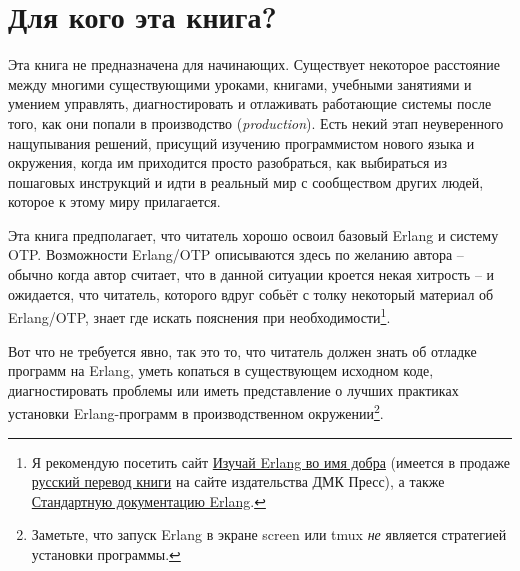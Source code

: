 \documentclass[11pt, oneside]{book}   	%
\begin{document}
\section*{Для кого эта книга?}
\label{sec:who-is-this-for}

Эта книга не предназначена для начинающих. Существует некоторое расстояние между многими существующими уроками, книгами, учебными занятиями и умением управлять, диагностировать и отлаживать работающие системы после того, как они попали в производство (\emph{production}). Есть некий этап неуверенного нащупывания решений, присущий изучению программистом нового языка и окружения, когда им приходится просто разобраться, как выбираться из пошаговых инструкций и идти в реальный мир с сообществом других людей, которое к этому миру прилагается.

Эта книга предполагает, что читатель хорошо освоил базовый Erlang и систему OTP. Возможности Erlang/OTP описываются здесь по желанию автора -- обычно когда автор считает, что в данной ситуации кроется некая хитрость -- и ожидается, что читатель, которого вдруг собьёт с толку некоторый материал об Erlang/OTP, знает где искать пояснения при необходимости\footnote{Я рекомендую посетить сайт \href{http://learnyousomeerlang.com}{Изучай Erlang во имя добра} (имеется в продаже \href{http://dmkpress.com/catalog/computer/programming/functional/978-5-97060-086-3/}{русский перевод книги} на сайте издательства ДМК Пресс), а также \href{http://www.erlang.org/erldoc}{Стандартную документацию Erlang}.}.

Вот что не требуется явно, так это то, что читатель должен знать об отладке программ на Erlang, уметь копаться в существующем исходном коде, диагностировать проблемы или иметь представление о лучших практиках установки Erlang-программ в производственном окружении\footnote{Заметьте, что запуск Erlang в экране screen или tmux \emph{не} является стратегией установки программы.}.
\end{document}

